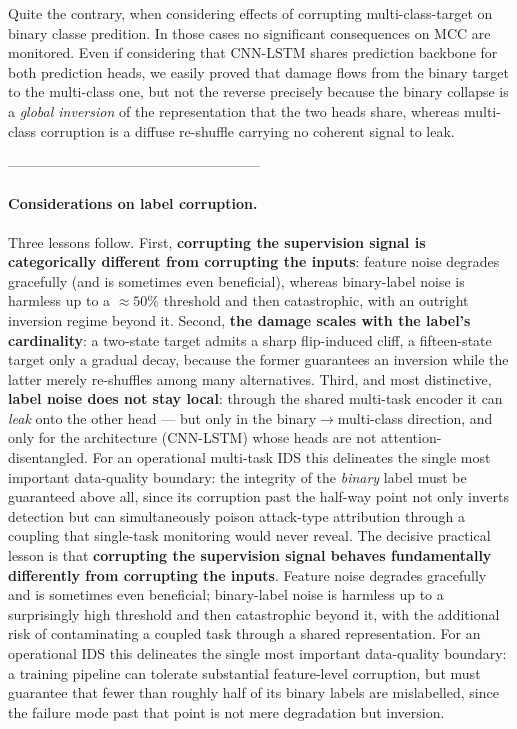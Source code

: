 \documentclass[../main.tex]{subfiles}
\begin{document}
Quite the contrary, when considering effects of corrupting multi-class-target on binary classe predition. In those cases no significant consequences on MCC are monitored. Even if considering that CNN-LSTM shares prediction backbone for both prediction heads, we easily proved that damage flows from the binary target to the multi-class one, but not the reverse precisely because the binary collapse is a \emph{global inversion} of the representation that the two heads share, whereas multi-class corruption is a diffuse re-shuffle carrying no coherent signal to leak. 








------------------------------------------------------

\paragraph{Considerations on label corruption.}
Three lessons follow. First, \textbf{corrupting the supervision signal is categorically different from corrupting the inputs}: feature noise degrades gracefully (and is sometimes even beneficial), whereas binary-label noise is harmless up to a $\approx 50\%$ threshold and then catastrophic, with an outright inversion regime beyond it. Second, \textbf{the damage scales with the label's cardinality}: a two-state target admits a sharp flip-induced cliff, a fifteen-state target only a gradual decay, because the former guarantees an inversion while the latter merely re-shuffles among many alternatives. Third, and most distinctive, \textbf{label noise does not stay local}: through the shared multi-task encoder it can \emph{leak} onto the other head --- but only in the binary$\rightarrow$multi-class direction, and only for the architecture (CNN-LSTM) whose heads are not attention-disentangled. For an operational multi-task IDS this delineates the single most important data-quality boundary: the integrity of the \emph{binary} label must be guaranteed above all, since its corruption past the half-way point not only inverts detection but can simultaneously poison attack-type attribution through a coupling that single-task monitoring would never reveal.
The decisive practical lesson is that \textbf{corrupting the supervision signal behaves fundamentally differently from corrupting the inputs}. Feature noise degrades gracefully and is sometimes even beneficial; binary-label noise is harmless up to a surprisingly high threshold and then catastrophic beyond it, with the additional risk of contaminating a coupled task through a shared representation. For an operational IDS this delineates the single most important data-quality boundary: a training pipeline can tolerate substantial feature-level corruption, but must guarantee that fewer than roughly half of its binary labels are mislabelled, since the failure mode past that point is not mere degradation but inversion.
\end{document}

